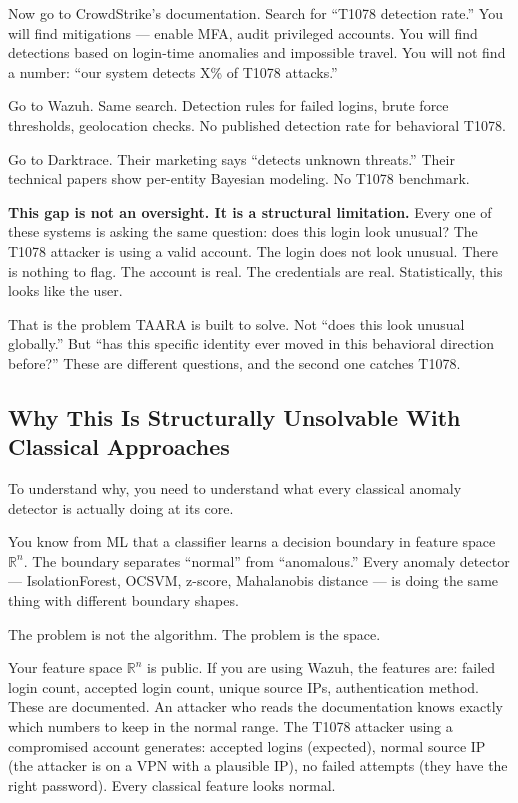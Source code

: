 \documentclass[11pt,a4paper]{article}
\begin{document}
Now go to CrowdStrike's documentation. Search for ``T1078 detection rate.'' You will find mitigations — enable MFA, audit privileged accounts. You will find detections based on login-time anomalies and impossible travel. You will not find a number: ``our system detects X\% of T1078 attacks.''

Go to Wazuh. Same search. Detection rules for failed logins, brute force thresholds, geolocation checks. No published detection rate for behavioral T1078.

Go to Darktrace. Their marketing says ``detects unknown threats.'' Their technical papers show per-entity Bayesian modeling. No T1078 benchmark.

\textbf{This gap is not an oversight. It is a structural limitation.} Every one of these systems is asking the same question: does this login look unusual? The T1078 attacker is using a valid account. The login does not look unusual. There is nothing to flag. The account is real. The credentials are real. Statistically, this looks like the user.

That is the problem TAARA is built to solve. Not ``does this look unusual globally.'' But ``has this specific identity ever moved in this behavioral direction before?'' These are different questions, and the second one catches T1078.

\subsection{Why This Is Structurally Unsolvable With Classical Approaches}

To understand why, you need to understand what every classical anomaly detector is actually doing at its core.

You know from ML that a classifier learns a decision boundary in feature space $\mathbb{R}^n$. The boundary separates ``normal'' from ``anomalous.'' Every anomaly detector — IsolationForest, OCSVM, z-score, Mahalanobis distance — is doing the same thing with different boundary shapes.

The problem is not the algorithm. The problem is the space.

Your feature space $\mathbb{R}^n$ is public. If you are using Wazuh, the features are: failed login count, accepted login count, unique source IPs, authentication method. These are documented. An attacker who reads the documentation knows exactly which numbers to keep in the normal range. The T1078 attacker using a compromised account generates: accepted logins (expected), normal source IP (the attacker is on a VPN with a plausible IP), no failed attempts (they have the right password). Every classical feature looks normal.
\end{document}
